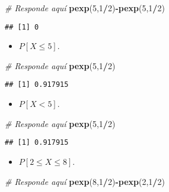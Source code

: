 \documentclass[
]{article}
\newenvironment{Shaded}{\begin{snugshade}}{\end{snugshade}}
\newcommand{\CommentTok}[1]{\textcolor[rgb]{0.56,0.35,0.01}{\textit{#1}}}
\newcommand{\DecValTok}[1]{\textcolor[rgb]{0.00,0.00,0.81}{#1}}
\newcommand{\KeywordTok}[1]{\textcolor[rgb]{0.13,0.29,0.53}{\textbf{#1}}}
\newcommand{\NormalTok}[1]{#1}
\newcommand{\OperatorTok}[1]{\textcolor[rgb]{0.81,0.36,0.00}{\textbf{#1}}}
\providecommand{\tightlist}{%
  \setlength{\itemsep}{0pt}\setlength{\parskip}{0pt}}
\begin{document}
\begin{Shaded}
\begin{Highlighting}[]
\CommentTok{# Responde aquí}
\KeywordTok{pexp}\NormalTok{(}\DecValTok{5}\NormalTok{,}\DecValTok{1}\OperatorTok{/}\DecValTok{2}\NormalTok{)}\OperatorTok{-}\KeywordTok{pexp}\NormalTok{(}\DecValTok{5}\NormalTok{,}\DecValTok{1}\OperatorTok{/}\DecValTok{2}\NormalTok{)}
\end{Highlighting}
\end{Shaded}

\begin{verbatim}
## [1] 0
\end{verbatim}

\begin{itemize}
\tightlist
\item
  \(P [X \leq 5]\).
\end{itemize}

\begin{Shaded}
\begin{Highlighting}[]
\CommentTok{# Responde aquí}
\KeywordTok{pexp}\NormalTok{(}\DecValTok{5}\NormalTok{,}\DecValTok{1}\OperatorTok{/}\DecValTok{2}\NormalTok{)}
\end{Highlighting}
\end{Shaded}

\begin{verbatim}
## [1] 0.917915
\end{verbatim}

\begin{itemize}
\tightlist
\item
  \(P [X < 5]\).
\end{itemize}

\begin{Shaded}
\begin{Highlighting}[]
\CommentTok{# Responde aquí}
\KeywordTok{pexp}\NormalTok{(}\DecValTok{5}\NormalTok{,}\DecValTok{1}\OperatorTok{/}\DecValTok{2}\NormalTok{)}
\end{Highlighting}
\end{Shaded}

\begin{verbatim}
## [1] 0.917915
\end{verbatim}

\begin{itemize}
\tightlist
\item
  \(P [2 \leq X \leq 8]\).
\end{itemize}

\begin{Shaded}
\begin{Highlighting}[]
\CommentTok{# Responde aquí}
\KeywordTok{pexp}\NormalTok{(}\DecValTok{8}\NormalTok{,}\DecValTok{1}\OperatorTok{/}\DecValTok{2}\NormalTok{)}\OperatorTok{-}\KeywordTok{pexp}\NormalTok{(}\DecValTok{2}\NormalTok{,}\DecValTok{1}\OperatorTok{/}\DecValTok{2}\NormalTok{)}
\end{Highlighting}
\end{Shaded}
\end{document}

